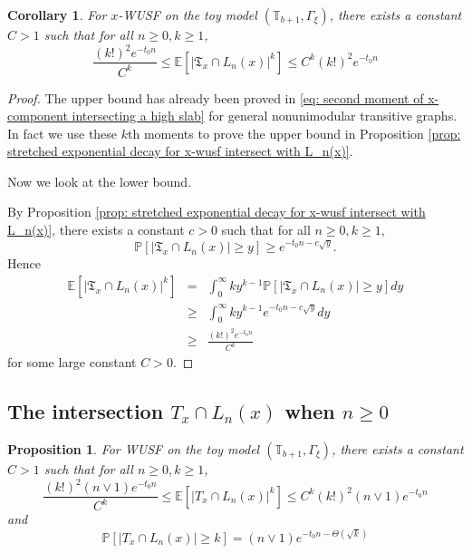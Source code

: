 \documentclass[12pt]{article}
\newtheorem{corollary}[theorem]{Corollary}
\newtheorem{proposition}[theorem]{Proposition}
\numberwithin{equation}{section}
\newcommand{\be}{\begin{equation}}
\newcommand{\ee}{\end{equation}}
\newcommand{\1}{\mathbf{1}}
\begin{document}
\begin{corollary}\label{cor: sharp high moments for x-wusf intersect L_n(x) on the toy model}
	For $x$-WUSF on the toy model $(\mathbb{T}_{b+1},\Gamma_{\xi})$, there exists a constant $C>1$ such that for all $n\geq0,k\geq 1$,
	\be\label{eq: sharp high moments for x-wusf intersect L_n(x) on the toy model}
	\frac{(k!)^2e^{-t_0n}}{C^k}\leq \mathbb{E}[|\mathfrak{T}_x\cap L_n(x)|^k]\leq C^k(k!)^2e^{-t_0n}
	\ee
\end{corollary}
\begin{proof}
	The upper bound has already been proved in \eqref{eq: second moment of x-component intersecting a high slab} for general nonunimodular transitive graphs. In fact we use these $k$th moments to prove the upper bound in Proposition \ref{prop: stretched exponential decay for x-wusf intersect with L_n(x)}.
	
	Now we look at the lower bound. 
	
	By  Proposition \ref{prop: stretched exponential decay for x-wusf intersect with L_n(x)}, there exists a constant $c>0$ such that for all $n\geq0,k\geq1$,
	\[
	\mathbb{P}[|\mathfrak{T}_x\cap L_n(x)|\geq y]\geq e^{-t_0n-c\sqrt{y}}.
	\]
   Hence 
   \begin{eqnarray}\label{eq: c_10 in appendix}
   \mathbb{E}[|\mathfrak{T}_x\cap L_n(x)|^k]&=&
   \int_{0}^{\infty}ky^{k-1}	\mathbb{P}[|\mathfrak{T}_x\cap L_n(x)|\geq y]dy\nonumber\\
   &\geq&\int_{0}^{\infty}ky^{k-1}e^{-t_0n-c\sqrt{y}}dy\nonumber\\
   &\geq&	\frac{(k!)^2e^{-t_0n}}{C^k}
   \end{eqnarray}
   for some large constant $C>0$.
\end{proof}


 \subsection{The intersection  $T_x\cap L_n(x)$ when $n\geq0$}
 
 \begin{proposition}\label{prop: sharp high moments for T_x intersect L_n(x) on the toy model}
 	For WUSF on the toy model $(\mathbb{T}_{b+1},\Gamma_{\xi})$, there exists a constant $C>1$ such that for all $n\geq0,k\geq 1$,
 	\be\label{eq: sharp high moments for T_x intersect L_n(x) on the toy model}
 	\frac{(k!)^2(n\vee 1)e^{-t_0n}}{C^k}\leq \mathbb{E}[|T_x\cap L_n(x)|^k]\leq C^k(k!)^2(n\vee 1)e^{-t_0n}
 	\ee
 and
	\be\label{eq: stretched exponential decay for T_x intersecting with L_n(x)}
	\mathbb{P}[|T_x\cap L_n(x)|\geq k]=(n\vee 1)e^{-t_0n-\Theta(\sqrt{k})}
	\ee
 \end{proposition}
\end{document}
